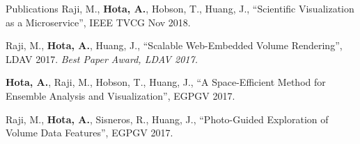 \documentclass{resume} %
\begin{document}
\begin{multicols}{2}
\begin{rSection}{Publications}
  Raji, M., \textbf{Hota, A.}, Hobson, T., Huang, J., ``Scientific Visualization as a Microservice'', IEEE TVCG Nov 2018. \href{https://doi.org/10.1109/TVCG.2018.2879672}{\faLink}

  Raji, M., \textbf{Hota, A.}, Huang, J., ``Scalable Web-Embedded Volume Rendering'', LDAV 2017.
  \textit{Best Paper Award, LDAV 2017.} \href{http://web.eecs.utk.edu/~ahota/pdfs/tapestry-ldav-2017.pdf}{\faFilePdfO}

  \textbf{Hota, A.}, Raji, M., Hobson, T., Huang, J., ``A Space-Efficient Method for Ensemble Analysis and Visualization'', EGPGV 2017. \href{http://web.eecs.utk.edu/~ahota/pdfs/nea-egpgv-2017.pdf}{\faFilePdfO}

  Raji, M., \textbf{Hota, A.}, Sisneros, R., Huang, J., ``Photo-Guided Exploration of Volume Data Features'', EGPGV 2017. \href{http://web.eecs.utk.edu/~ahota/pdfs/photoguided-egpgv-2017.pdf}{\faFilePdfO}
\end{rSection}

\end{multicols}

\end{document}
